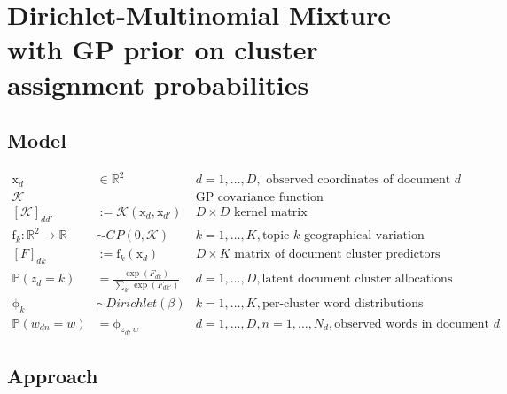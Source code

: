 \documentclass{report}
\renewcommand{\v}[1]{\boldsymbol{\mathrm{#1}}}
\renewcommand{\P}{\mathbb{P}}
\begin{document}
\chapter{Dirichlet-Multinomial Mixture with GP prior on cluster
  assignment probabilities}

\section{Model}
\begin{align*}
  \v{x}_d &\in \mathbb{R}^2 & d = 1, \ldots, D, \text{ observed
    coordinates of document } d \\
  \mathcal{K} & & \text{GP covariance function} \\
  [\mathcal{K}]_{dd'} &:= \mathcal{K}(\v{x}_d, \v{x}_{d'}) &
  D\times D \text{ kernel matrix} \\
  \v{f}_k : \mathbb{R}^2 \to \mathbb{R} & \sim GP(0, \mathcal{K}) &
  k = 1, \ldots, K, \text{topic $k$ geographical variation} \\
  [F]_{dk} &:= \v{f}_k(\v{x}_d) & D\times K \text{ matrix of document
    cluster predictors} \\
  \P(z_d = k) &= \frac{\exp(F_{dk})}{\sum_{k'}\exp(F_{dk'})} &
  d = 1, \ldots, D, \text{latent document cluster allocations} \\
  \v\phi_k & \sim Dirichlet(\beta) & k=1,\ldots,K, \text{per-cluster
    word distributions} \\
  \P({w}_{dn}=w) &= \v\phi_{z_d,w} & d = 1, \ldots, D, n = 1, \ldots, N_d,
  \text{observed words in document } d
\end{align*}

\section{Approach}
\end{document}
